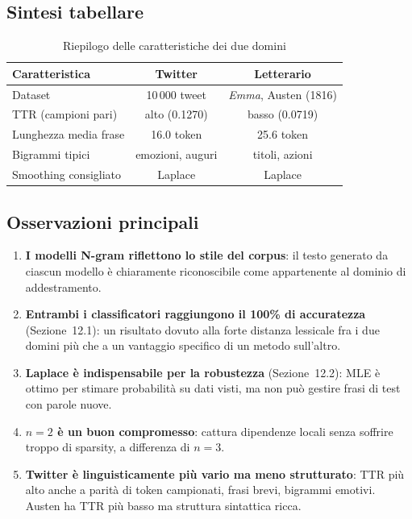 ﻿\documentclass[12pt,a4paper]{article}
\begin{document}
\subsection{Sintesi tabellare}

\begin{table}[H]
  \centering
  \caption{Riepilogo delle caratteristiche dei due domini}
  \begin{tabular}{lcc}
    \toprule
    \textbf{Caratteristica}  & \textbf{Twitter}   & \textbf{Letterario} \\
    \midrule
    Dataset                  & 10\,000 tweet      & \textit{Emma}, Austen (1816) \\
    TTR (campioni pari)      & alto (0.1270)      & basso (0.0719)      \\
    Lunghezza media frase    & 16.0 token         & 25.6 token          \\
    Bigrammi tipici          & emozioni, auguri   & titoli, azioni      \\
    Smoothing consigliato    & Laplace            & Laplace             \\
    \bottomrule
  \end{tabular}
\end{table}

\subsection{Osservazioni principali}

\begin{enumerate}
  \item \textbf{I modelli N-gram riflettono lo stile del corpus}: il testo generato da ciascun modello è chiaramente riconoscibile come appartenente al dominio di addestramento.

  \item \textbf{Entrambi i classificatori raggiungono il 100\% di accuratezza} (Sezione~12.1): un risultato dovuto alla forte distanza lessicale fra i due domini più che a un vantaggio specifico di un metodo sull'altro.

  \item \textbf{Laplace è indispensabile per la robustezza} (Sezione~12.2): MLE è ottimo per stimare probabilità su dati visti, ma non può gestire frasi di test con parole nuove.

  \item \textbf{$n=2$ è un buon compromesso}: cattura dipendenze locali senza soffrire troppo di sparsity, a differenza di $n=3$.

  \item \textbf{Twitter è linguisticamente più vario ma meno strutturato}: TTR più alto anche a parità di token campionati, frasi brevi, bigrammi emotivi. Austen ha TTR più basso ma struttura sintattica ricca.
\end{enumerate}
\end{document}
